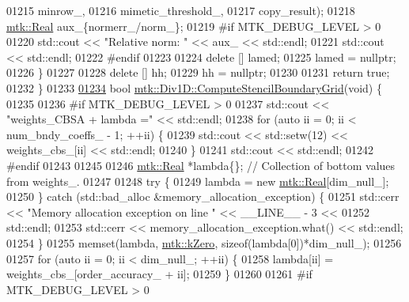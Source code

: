\begin{DoxyCode}
{{01215                                                         minrow\_,
01216                                                         mimetic\_threshold\_,
01217                                                         copy\_result);
01218     \hyperlink{group__c01-roots_gac080bbbf5cbb5502c9f00405f894857d}{mtk::Real} aux\_\{normerr\_/norm\_\};
01219 \textcolor{preprocessor}{    #if MTK\_DEBUG\_LEVEL > 0}
01220     std::cout << \textcolor{stringliteral}{"Relative norm: "} << aux\_ << std::endl;
01221     std::cout << std::endl;
01222 \textcolor{preprocessor}{    #endif}
01223 
01224     \textcolor{keyword}{delete} [] lamed;
01225     lamed = \textcolor{keyword}{nullptr};
01226   \}
01227 
01228   \textcolor{keyword}{delete} [] hh;
01229   hh = \textcolor{keyword}{nullptr};
01230 
01231   \textcolor{keywordflow}{return} \textcolor{keyword}{true};
01232 \}
01233 
\hypertarget{mtk__div__1d_8cc_source_l01234}{}\hyperlink{classmtk_1_1Div1D_a29bb417c76286414dce9258a0bcb5aab}{01234} \textcolor{keywordtype}{bool} \hyperlink{classmtk_1_1Div1D_a29bb417c76286414dce9258a0bcb5aab}{mtk::Div1D::ComputeStencilBoundaryGrid}(\textcolor{keywordtype}{void}) \{
01235 
01236 \textcolor{preprocessor}{  #if MTK\_DEBUG\_LEVEL > 0}
01237   std::cout << \textcolor{stringliteral}{"weights\_CBSA + lambda ="} << std::endl;
01238   \textcolor{keywordflow}{for} (\textcolor{keyword}{auto} ii = 0; ii < num\_bndy\_coeffs\_ - 1; ++ii) \{
01239     std::cout << std::setw(12) << weights\_cbs\_[ii] << std::endl;
01240   \}
01241   std::cout << std::endl;
01242 \textcolor{preprocessor}{  #endif}
01243 
01245 
01246   \hyperlink{group__c01-roots_gac080bbbf5cbb5502c9f00405f894857d}{mtk::Real} *lambda\{\}; \textcolor{comment}{// Collection of bottom values from weights\_.}
01247 
01248   \textcolor{keywordflow}{try} \{
01249     lambda = \textcolor{keyword}{new} \hyperlink{group__c01-roots_gac080bbbf5cbb5502c9f00405f894857d}{mtk::Real}[dim\_null\_];
01250   \} \textcolor{keywordflow}{catch} (std::bad\_alloc &memory\_allocation\_exception) \{
01251     std::cerr << \textcolor{stringliteral}{"Memory allocation exception on line "} << \_\_LINE\_\_ - 3 <<
01252       std::endl;
01253     std::cerr << memory\_allocation\_exception.what() << std::endl;
01254   \}
01255   memset(lambda, \hyperlink{group__c01-roots_ga59a451a5fae30d59649bcda274fea271}{mtk::kZero}, \textcolor{keyword}{sizeof}(lambda[0])*dim\_null\_);
01256 
01257   \textcolor{keywordflow}{for} (\textcolor{keyword}{auto} ii = 0; ii < dim\_null\_; ++ii) \{
01258     lambda[ii] = weights\_cbs\_[order\_accuracy\_ + ii];
01259   \}
01260 
01261 \textcolor{preprocessor}{  #if MTK\_DEBUG\_LEVEL > 0}
}}
\end{DoxyCode}
